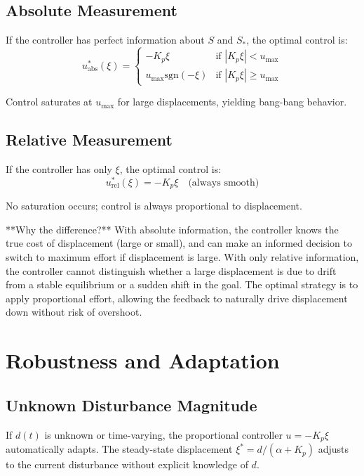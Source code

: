 \documentclass[12pt]{article}
\begin{document}
\subsection{Absolute Measurement}

If the controller has perfect information about $S$ and $S_*$, the optimal control is:
\begin{equation}
u^*_{\text{abs}}(\xi) = \begin{cases}
-K_p \xi & \text{if } |K_p \xi| < u_{\max} \\
u_{\max} \text{sgn}(-\xi) & \text{if } |K_p \xi| \geq u_{\max}
\end{cases}
\end{equation}

Control saturates at $u_{\max}$ for large displacements, yielding bang-bang behavior.

\subsection{Relative Measurement}

If the controller has only $\xi$, the optimal control is:
\begin{equation}
u^*_{\text{rel}}(\xi) = -K_p \xi \quad \text{(always smooth)}
\end{equation}

No saturation occurs; control is always proportional to displacement.

**Why the difference?** With absolute information, the controller knows the true cost of displacement (large or small), and can make an informed decision to switch to maximum effort if displacement is large. With only relative information, the controller cannot distinguish whether a large displacement is due to drift from a stable equilibrium or a sudden shift in the goal. The optimal strategy is to apply proportional effort, allowing the feedback to naturally drive displacement down without risk of overshoot.

\section{Robustness and Adaptation}

\subsection{Unknown Disturbance Magnitude}

If $d(t)$ is unknown or time-varying, the proportional controller $u = -K_p \xi$ automatically adapts. The steady-state displacement $\xi^* = d / (\alpha + K_p)$ adjusts to the current disturbance without explicit knowledge of $d$.
\end{document}
